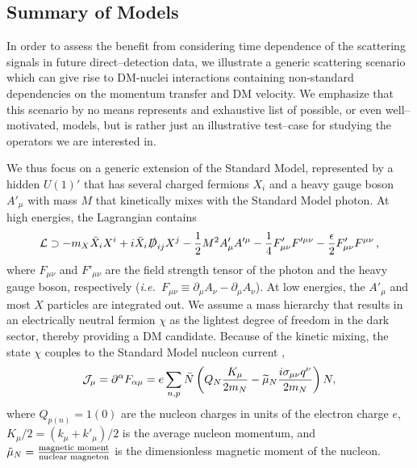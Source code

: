 \documentclass[11pt]{article}
\newcommand{\ie}{{\it i.e.~}}  \newcommand{\eg}{{\it e.g.~}}
\newcommand{\pL}{\left(} \newcommand{\pR}{\right)} \newcommand{\bL}{\left[} \newcommand{\bR}{\right]} \newcommand{\cbL}{\left\{} \newcommand{\cbR}{\right\}} \newcommand{\mL}{\left|} \newcommand{\mR}{\right|} \newcommand{\ER}{E_R}
\newcommand{\beq}{\begin{equation}} \newcommand{\eeq}{\end{equation}}
\begin{document}
\subsection{Summary of Models}\label{sec:models}
In order to assess the benefit from considering time dependence of the scattering signals in future direct--detection data, we illustrate a generic scattering scenario which can give rise to DM-nuclei interactions containing non-standard dependencies on the momentum transfer and DM velocity. We emphasize that this scenario by no means represents and exhaustive list of possible, or even well--motivated, models, but is rather just an illustrative test--case for studying the operators we are interested in. 

We thus focus on a generic extension of the Standard Model, represented by a hidden $U(1)'$ that has several charged fermions $X_i$ and a heavy gauge boson $A'_\mu$ with mass $M$ that kinetically mixes with the Standard Model photon. At high energies, the Lagrangian contains
\beq \label{eq:UV-model}
\cL \supset -  m_X \bar X_i X^i + i \bar X_i \slashed D_{ij} X^j  - \frac12 M^2 A'_\mu A'^\mu  - \frac14 F'_{\mu \nu} F'^{\mu \nu} - \frac\epsilon2 F'_{\mu \nu} F^{\mu \nu} \, ,
\eeq
where $F_{\mu \nu}$ and $F'_{\mu \nu}$ are the field strength tensor of the photon and the heavy gauge boson, respectively (\ie $F_{\mu \nu} \equiv \partial_\mu A_\nu - \partial_\mu A_\nu$). At low energies, the $A'_\mu$ and most $X$ particles are integrated out. We assume a mass hierarchy that results in an electrically neutral fermion $\chi$ as the lightest degree of freedom in the dark sector, thereby providing a DM candidate. Because of the kinetic mixing, the state $\chi$ couples to the Standard Model nucleon current \cite{Gresham:2014vja},
\beq \label{eq:current}
\cJ_\mu = \partial^\alpha F_{\alpha \mu} = e \sum_{n,p} \bar N \pL Q_N \frac{K_\mu}{2m_N} -\widetilde \mu_N \frac{i \sigma_{\mu \nu}q^\nu}{2m_N} \pR N,
\eeq 
where $Q_{p(n)}=1(0)$ are the nucleon charges in units of the electron charge $e$, $K_\mu/2 = (k_\mu + k'_\mu)/2$ is the average nucleon momentum, and $\tilde{\mu}_N = {\text{magnetic moment} \over \text{nuclear magneton}}$ is the dimensionless magnetic moment of the nucleon.
\end{document}
